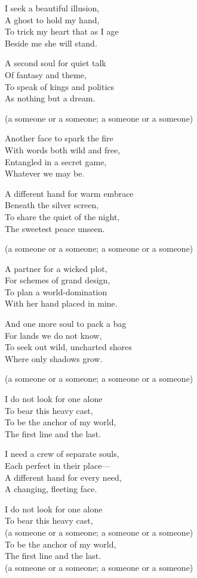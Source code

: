 \begin{lyrics}
I seek a beautiful illusion,\\
A ghost to hold my hand,\\
To trick my heart that as I age\\
Beside me she will stand.

A second soul for quiet talk\\
Of fantasy and theme,\\
To speak of kings and politics\\
As nothing but a dream.

(a someone or a someone; a someone or a someone)

Another face to spark the fire\\
With words both wild and free,\\
Entangled in a secret game,\\
Whatever we may be.

A different hand for warm embrace\\
Beneath the silver screen,\\
To share the quiet of the night,\\
The sweetest peace unseen.

(a someone or a someone; a someone or a someone)

A partner for a wicked plot,\\
For schemes of grand design,\\
To plan a world-domination\\
With her hand placed in mine.

And one more soul to pack a bag\\
For lands we do not know,\\
To seek out wild, uncharted shores\\
Where only shadows grow.

(a someone or a someone; a someone or a someone)

I do not look for one alone\\
To bear this heavy cast,\\
To be the anchor of my world,\\
The first line and the last.

I need a crew of separate souls,\\
Each perfect in their place—\\
A different hand for every need,\\
A changing, fleeting face.

I do not look for one alone\\
To bear this heavy cast,\\
(a someone or a someone; a someone or a someone)\\
To be the anchor of my world,\\
The first line and the last.\\
(a someone or a someone; a someone or a someone)

\end{lyrics}

